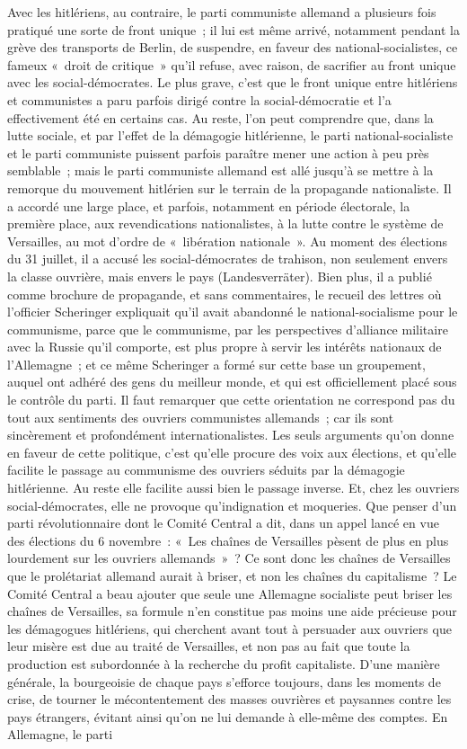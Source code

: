 \documentclass[french,twoside]{book} %
\begin{document}
Avec les hitlériens, au contraire, le parti communiste allemand a plusieurs fois pratiqué une sorte de front unique ; il lui est même arrivé, notamment pendant la grève des transports de Berlin, de suspendre, en faveur des national-socialistes, ce fameux « droit de critique » qu'il refuse, avec raison, de sacrifier au front unique avec les social-démocrates. Le plus grave, c'est que le front unique entre hitlériens et communistes a paru parfois dirigé contre la social-démocratie et l'a effectivement été en certains cas. Au reste, l'on peut comprendre que, dans la lutte sociale, et par l'effet de la démagogie hitlé­rienne, le parti national-socialiste et le parti communiste puissent parfois paraître mener une action à peu près semblable ; mais le parti communiste allemand est allé jusqu'à se mettre à la remorque du mouvement hitlérien sur le terrain de la propagande nationaliste. Il a accordé une large place, et parfois, notamment en période électorale, la première place, aux revendications nationalistes, à la lutte contre le système de Versailles, au mot d'ordre de « libération nationale ». Au moment des élections du 31 juillet, il a accusé les social-démocrates de trahison, non seulement envers la classe ouvrière, mais envers le pays (Landesverräter). Bien plus, il a publié comme brochure de propagande, et sans commentaires, le recueil des lettres où l'officier Scheringer expliquait qu'il avait abandonné le national-socialisme pour le communisme, parce que le communisme, par les perspectives d'alliance mili­taire avec la Russie qu'il comporte, est plus propre à servir les intérêts nationaux de l'Allemagne ; et ce même Scheringer a formé sur cette base un groupement, auquel ont adhéré des gens du meilleur monde, et qui est officiellement placé sous le contrôle du parti. Il faut remarquer que cette orientation ne correspond pas du tout aux sentiments des ouvriers communis­tes allemands ; car ils sont sincèrement et profondément internationalistes. Les seuls arguments qu'on donne en faveur de cette politique, c'est qu'elle procure des voix aux élections, et qu'elle facilite le passage au communisme des ouvriers séduits par la démagogie hitlérienne. Au reste elle facilite aussi bien le passage inverse. Et, chez les ouvriers social-démocrates, elle ne provoque qu'indignation et moqueries. Que penser d'un parti révolutionnaire dont le Comité Central a dit, dans un appel lancé en vue des élections du 6 novem­bre : « Les chaînes de Versailles pèsent de plus en plus lourdement sur les ouvriers allemands » ? Ce sont donc les chaînes de Versailles que le prolé­tariat allemand aurait à briser, et non les chaînes du capitalisme ? Le Comité Central a beau ajouter que seule une Allemagne socialiste peut briser les chaînes de Versailles, sa formule n'en constitue pas moins une aide précieuse pour les démagogues hitlériens, qui cherchent avant tout à persuader aux ouvriers que leur misère est due au traité de Versailles, et non pas au fait que toute la production est subordonnée à la recherche du profit capitaliste. D'une manière générale, la bourgeoisie de chaque pays s'efforce toujours, dans les moments de crise, de tourner le mécontentement des masses ouvrières et paysannes contre les pays étrangers, évitant ainsi qu'on ne lui demande à elle-même des comptes. En Allemagne, le parti 
\end{document}
